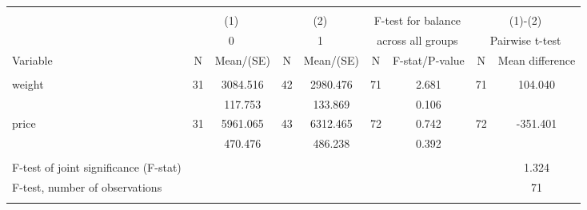 
\begin{tabular}{@{\extracolsep{5pt}}lcccccccc}
\\[-1.8ex]\hline \hline \\[-1.8ex]
 & \multicolumn{2}{c}{(1)}  & \multicolumn{2}{c}{(2)}  & \multicolumn{2}{c}{F-test for balance} & \multicolumn{2}{c}{(1)-(2)} \\
 & \multicolumn{2}{c}{0}  & \multicolumn{2}{c}{1}  & \multicolumn{2}{c}{across all groups} & \multicolumn{2}{c}{Pairwise t-test}  \\
Variable & N & Mean/(SE) & N & Mean/(SE) & N & F-stat/P-value & N & Mean difference \\ \hline \\[-1.8ex] 
weight   & 31    &  3084.516    & 42    &  2980.476    & 71    &     2.681    & 71    &   104.040   \\
 &   &   117.753  &   &   133.869  &   &     0.106  &   &   \\
price   & 31    &  5961.065    & 43    &  6312.465    & 72    &     0.742    & 72    &  -351.401   \\
 &   &   470.476  &   &   486.238  &   &     0.392  &   &   \\
\hline \\[-1.8ex]
F-test of joint significance (F-stat) & &   & &   & &     & &      1.324   \\
F-test, number of observations & &   & &   & &   & &  71   \\
\hline \\[-1.8ex]

\end{tabular}
